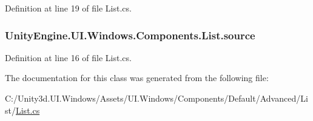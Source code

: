 Definition at line 19 of file List.\+cs.

\hypertarget{class_unity_engine_1_1_u_i_1_1_windows_1_1_components_1_1_list_a0acb8436079981b08f09de21df87a1e9}{}
\subsubsection[{source}]{ Unity\+Engine.\+U\+I.\+Windows.\+Components.\+List.\+source}\label{class_unity_engine_1_1_u_i_1_1_windows_1_1_components_1_1_list_a0acb8436079981b08f09de21df87a1e9}


Definition at line 16 of file List.\+cs.



The documentation for this class was generated from the following file\+:\begin{DoxyCompactItemize}
\item 
C\+:/\+Unity3d.\+U\+I.\+Windows/\+Assets/\+U\+I.\+Windows/\+Components/\+Default/\+Advanced/\+List/\hyperlink{_list_8cs}{List.\+cs}\end{DoxyCompactItemize}
